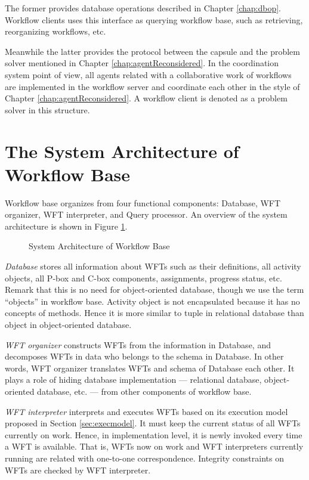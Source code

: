 The former provides database operations described in Chapter
\ref{chap:dbop}.  Workflow clients uses this interface as querying
workflow base, such as retrieving, reorganizing workflows, etc.

Meanwhile the latter provides the protocol between the capsule and the
problem solver mentioned in Chapter \ref{chap:agentReconsidered}.  In
the coordination system point of view, all agents related with a
collaborative work of workflows are implemented in the workflow server
and coordinate each other in the style of Chapter
\ref{chap:agentReconsidered}.  A workflow client is denoted as a problem
solver in this structure.

\section{The System Architecture of Workflow Base}

\begin{sloppypar}
 Workflow base organizes from four functional components: Database, WFT
 organizer, WFT interpreter, and Query processor.  An overview of the
 system architecture is shown in Figure \ref{fig:wfarch}.
\end{sloppypar}

\begin{figure}
\begin{center}
\setlength{\unitlength}{0.4mm}
{\small
 
}
\end{center}
\caption{System Architecture of Workflow Base}
\label{fig:wfarch}
\end{figure}

\emph{Database} stores all information about WFTs such as their
definitions, all activity objects, all P-box and C-box components,
assignments, progress status, etc.  Remark that this is no need for
object-oriented database, though we use the term ``objects'' in workflow
base.  Activity object is not encapsulated because it has no concepts of
methods.  Hence it is more similar to tuple in relational database than
object in object-oriented database.

\emph{WFT organizer} constructs WFTs from the information in Database,
and decomposes WFTs in data who belongs to the schema in Database.  In
other words, WFT organizer translates WFTs and schema of Database each
other.  It plays a role of hiding database implementation --- relational
database, object-oriented database, etc. --- from other components of
workflow base.

\emph{WFT interpreter} interprets and executes WFTs based on its
execution model proposed in Section \ref{sec:execmodel}.  It must keep
the current status of all WFTs currently on work.  Hence, in
implementation level, it is newly invoked every time a WFT is
available.  That is, WFTs now on work and WFT interpreters currently
running are related with one-to-one correspondence.  Integrity
constraints on WFTs are checked by WFT interpreter.

